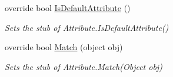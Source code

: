\begin{DoxyCompactItemize}
override bool \hyperlink{class_system_1_1_component_model_1_1_fakes_1_1_stub_attribute_provider_attribute_a53393042d325d8b87b61d402ac315f8e}{Is\-Default\-Attribute} ()
\begin{DoxyCompactList}\small\item\em Sets the stub of Attribute.\-Is\-Default\-Attribute()\end{DoxyCompactList}\item 
override bool \hyperlink{class_system_1_1_component_model_1_1_fakes_1_1_stub_attribute_provider_attribute_a09fd368d09df4c959d50418a6ee85bc7}{Match} (object obj)
\begin{DoxyCompactList}\small\item\em Sets the stub of Attribute.\-Match(\-Object obj)\end{DoxyCompactList}\end{DoxyCompactItemize}
